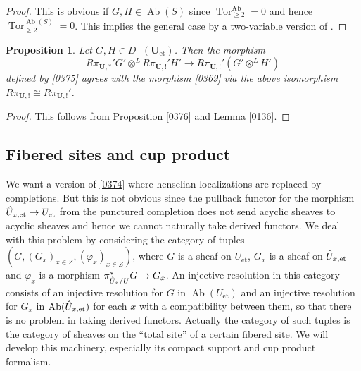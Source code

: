 \documentclass{amsart}
\newtheorem{Prop}[Thm]{Proposition}
\theoremstyle{remark}
\numberwithin{equation}{subsection}
\newcommand{\tensor}{\mathbin{\otimes}}
\newcommand{\et}{\mathrm{et}}
\newcommand{\alg}[1]{\mathbf{#1}}
\DeclareMathOperator{\Tor}{Tor}
\DeclareMathOperator{\Ab}{Ab}
\begin{document}
\begin{proof}
	This is obvious if $G, H \in \Ab(S)$
	since $\Tor_{\ge 2}^{\Ab} = 0$ and hence $\Tor_{\ge 2}^{\Ab(S)} = 0$.
	This implies the general case
	by a two-variable version of \cite[Tag 07K8 (4c)]{Sta21}.
\end{proof}

\begin{Prop} \label{0379}
	Let $G, H \in D^{+}(\alg{U}_{\et})$.
	Then the morphism
		\[
					R \pi_{\alg{U}, \ast}' G'
				\tensor^{L}
					R \pi_{\alg{U}, !}' H'
			\to
				R \pi_{\alg{U}, !}'(G' \tensor^{L} H')
		\]
	defined by \eqref{0375} agrees with the morphism \eqref{0369}
	via the above isomorphism
	$R \pi_{\alg{U}, !} \cong R \pi_{\alg{U}, !}'$.
\end{Prop}

\begin{proof}
	This follows from Proposition \ref{0376} and Lemma \ref{0136}.
\end{proof}


\subsection{Fibered sites and cup product}
\label{0325}

We want a version of \eqref{0374} where henselian localizations are replaced by completions.
But this is not obvious since the pullback functor for
the morphism $\Hat{U}_{x, \et} \to U_{\et}$ from the punctured completion
does not send acyclic sheaves to acyclic sheaves
and hence we cannot naturally take derived functors.
We deal with this problem by considering the category of tuples
$(G, (G_{x})_{x \in Z}, (\varphi_{x})_{x \in Z})$,
where $G$ is a sheaf on $U_{\et}$, 
$G_{x}$ is a sheaf on $\Hat{U}_{x, \et}$
and $\varphi_{x}$ is a morphism $\pi_{\Hat{U}_{x} / U}^{\ast} G \to G_{x}$.
An injective resolution in this category consists of
an injective resolution for $G$ in $\Ab(U_{\et})$ and
an injective resolution for $G_{x}$ in $\Ab(\Hat{U}_{x, \et})$ for each $x$
with a compatibility between them,
so that there is no problem in taking derived functors.
Actually the category of such tuples is the category of sheaves on the ``total site''
of a certain fibered site.
We will develop this machinery,
especially its compact support and cup product formalism.
\end{document}
